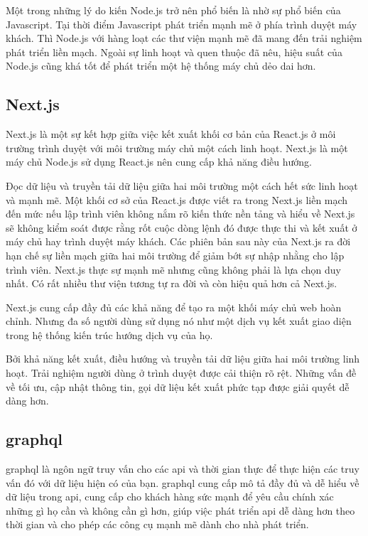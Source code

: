 	Một trong những lý do kiến Node.js trở nên phổ biến là nhờ sự phổ biến của Javascript. Tại thời điểm Javascript phát triển mạnh mẽ ở phía trình duyệt máy khách. Thì Node.js với hàng loạt các thư viện mạnh mẽ đã mang đến trải nghiệm phát triển liền mạch. Ngoài sự linh hoạt và quen thuộc đã nêu, hiệu suất của Node.js cũng khá tốt để phát triển một hệ thống máy chủ dẻo dai hơn.
	
	\subsection{Next.js}
	
	Next.js \cite{nextjs} là một sự kết hợp giữa việc kết xuất khối cơ bản của React.js ở môi trường trình duyệt với môi trường máy chủ một cách linh hoạt.
	Next.js là một máy chủ Node.js sử dụng React.js nên cung cấp khả năng điều hướng.
	
	Đọc dữ liệu và truyền tải dữ liệu giữa hai môi trường một cách hết sức linh hoạt và mạnh mẽ.
	Một khối cơ sở của React.js được viết ra trong Next.js liền mạch đến mức nếu lập trình viên không nắm rõ kiến thức nền tảng và hiểu về Next.js sẽ không kiểm soát được rằng rốt cuộc dòng lệnh đó được thực thi và kết xuất ở máy chủ hay trình duyệt máy khách.
	Các phiên bản sau này của Next.js ra đời hạn chế sự liền mạch giữa hai môi trường để giảm bớt sự nhập nhằng cho lập trình viên.
	Next.js thực sự mạnh mẽ nhưng cũng không phải là lựa chọn duy nhất. Có rất nhiều thư viện tương tự ra đời và còn hiệu quả hơn cả Next.js.
	
	Next.js cung cấp đầy đủ các khả năng để tạo ra một khối máy chủ web hoàn chỉnh. Nhưng đa số người dùng sử dụng nó như một dịch vụ kết xuất giao diện trong hệ thống kiến trúc hướng dịch vụ của họ.
	
	Bởi khả năng kết xuất, điều hướng và truyền tải dữ liệu giữa hai môi trường linh hoạt. Trải nghiệm người dùng ở trình duyệt được cải thiện rõ rệt. Những vấn đề về tối ưu, cập nhật thông tin, gọi dữ liệu kết xuất phức tạp được giải quyết dễ dàng hơn.
	
	\subsection{\acrshort{graphql}}
	
	\acrshort{graphql} \cite{graphql} là ngôn ngữ truy vấn cho các \acrshort{api} \cite{api} và thời gian thực để thực hiện các truy vấn đó với dữ liệu hiện có của bạn. \acrshort{graphql} cung cấp mô tả đầy đủ và dễ hiểu về dữ liệu trong \acrshort{api}, cung cấp cho khách hàng sức mạnh để yêu cầu chính xác những gì họ cần và không cần gì hơn, giúp việc phát triển \acrshort{api} dễ dàng hơn theo thời gian và cho phép các công cụ mạnh mẽ dành cho nhà phát triển.
	
